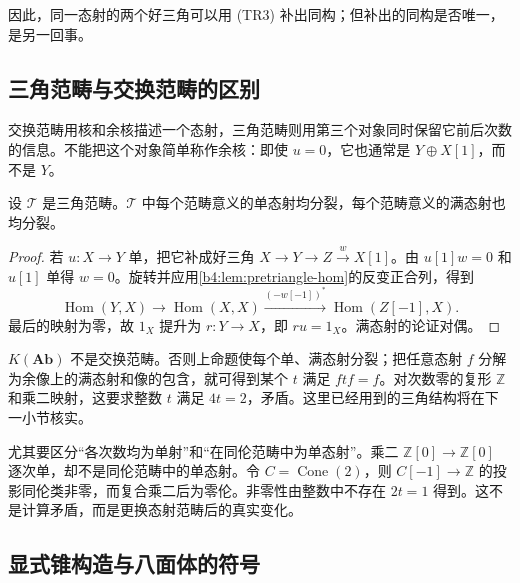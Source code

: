 因此，同一态射的两个好三角可以用 (TR3) 补出同构；但补出的同构是否唯一，是另一回事。

\subsection{三角范畴与交换范畴的区别}
\label{b4:subsec:1602:03}

交换范畴用核和余核描述一个态射，三角范畴则用第三个对象同时保留它前后次数的信息。不能把这个对象简单称作余核：即使 \(u=0\)，它也通常是 \(Y\oplus X[1]\)，而不是 \(Y\)。

\begin{proposition}\label{b4:prop:triangle-mono-splits}
设 \(\mathcal T\) 是三角范畴。\(\mathcal T\) 中每个范畴意义的单态射均分裂，每个范畴意义的满态射也均分裂。
\end{proposition}
\begin{proof}
若 \(u:X\to Y\) 单，把它补成好三角 \(X\to Y\to Z\xrightarrow{w}X[1]\)。由 \(u[1]w=0\) 和 \(u[1]\) 单得 \(w=0\)。旋转并应用\cref{b4:lem:pretriangle-hom}的反变正合列，得到
\[
 \operatorname{Hom}(Y,X)\longrightarrow\operatorname{Hom}(X,X)
 \xrightarrow{(-w[-1])^*}\operatorname{Hom}(Z[-1],X).
\]
最后的映射为零，故 \(1_X\) 提升为 \(r:Y\to X\)，即 \(ru=1_X\)。满态射的论证对偶。
\end{proof}

\(K(\mathbf{Ab})\) 不是交换范畴。否则上命题使每个单、满态射分裂；把任意态射 \(f\) 分解为余像上的满态射和像的包含，就可得到某个 \(t\) 满足 \(ftf=f\)。对次数零的复形 \(\mathbb Z\) 和乘二映射，这要求整数 \(t\) 满足 \(4t=2\)，矛盾。这里已经用到的三角结构将在下一小节核实。

\ProseParagraphBreak
尤其要区分“各次数均为单射”和“在同伦范畴中为单态射”。乘二 \(\mathbb Z[0]\to\mathbb Z[0]\) 逐次单，却不是同伦范畴中的单态射。令 \(C=\operatorname{Cone}(2)\)，则 \(C[-1]\to\mathbb Z\) 的投影同伦类非零，而复合乘二后为零伦。非零性由整数中不存在 \(2t=1\) 得到。这不是计算矛盾，而是更换态射范畴后的真实变化。

\subsection{显式锥构造与八面体的符号}
\label{b4:subsec:1602:04}

